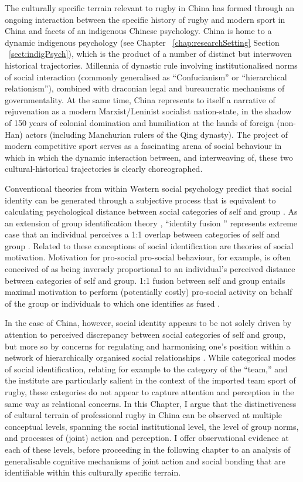 The culturally specific terrain relevant to rugby in China has formed through an ongoing interaction between the specific history of rugby and modern sport in China and facets of an indigenous Chinese psychology.  China is home to a dynamic indigenous psychology (see Chapter ~\ref{chap:researchSetting} Section ~\ref{sect:indigPsych}), which is the product of a number of distinct but interwoven historical trajectories.   Millennia of dynastic rule involving institutionalised norms of social interaction (commonly generalised as ``Confucianism'' or ``hierarchical relationism''), combined with draconian legal and bureaucratic mechanisms of governmentality.  At the same time, China represents to itself a narrative of rejuvenation as a modern Marxist/Leninist socialist nation-state, in the shadow of 150 years of colonial domination and humiliation at the hands of foreign (non-Han) actors (including Manchurian rulers of the Qing dynasty).  The project of modern competitive sport serves as a fascinating arena of social behaviour in which in which the dynamic interaction between, and interweaving of, these two cultural-historical trajectories is clearly choreographed.

Conventional theories from within Western social psychology predict that social identity can be generated through a subjective process that is equivalent to calculating psychological distance between social categories of self and group \citep{Tajfel1971}.  As an extension of group identification theory \citep{Turner1987}, ``identity fusion '' represents extreme case that an individual perceives a 1:1 overlap between categories of self and group \citep{Swann2009}.  Related to these conceptions of social identification are theories of social motivation.  Motivation for pro-social pro-social behaviour, for example, is often conceived of as being inversely proportional to an individual's perceived distance between categories of self and group. 1:1 fusion between self and group entails maximal motivation to perform (potentially costly) pro-social activity on behalf of the group or individuals to which one identifies as fused \citep{Swann2015}.

In the case of China, however, social identity appears to be not solely driven by attention to perceived discrepancy between social categories of self and group, but more so by concerns for regulating and harmonising one's position within a network of hierarchically organised social relationships \citep{Liu2009}.  While categorical modes of social identification, relating for example to the category of the ``team,'' and the institute are particularly salient in the context of the imported team sport of rugby, these categories do not appear to capture attention and perception in the same way as relational concerns.  In this Chapter, I argue that the distinctiveness of cultural terrain of professional rugby in China can be observed at multiple conceptual levels, spanning the social institutional level,  the level of group norms, and processes of (joint) action and perception.  I offer observational evidence at each of these levels, before proceeding in the following chapter to an analysis of generalisable cognitive mechanisms of joint action and social bonding that are identifiable within this culturally specific terrain.
